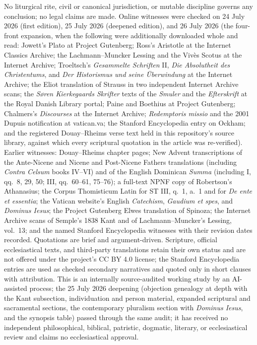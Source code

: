 No liturgical rite, civil or canonical jurisdiction, or mutable discipline governs any conclusion; no legal claims are made. Online witnesses were checked on 24 July 2026 (first edition), 25 July 2026 (deepened edition), and 26 July 2026 (the four-front expansion, when the following were additionally downloaded whole and read: Jowett's Plato at Project Gutenberg; Ross's Aristotle at the Internet Classics Archive; the Lachmann--Muncker Lessing and the Viv\`es Scotus at the Internet Archive; Troeltsch's \emph{Gesammelte Schriften} II, \emph{Die Absolutheit des Christentums}, and \emph{Der Historismus und seine \"Uberwindung} at the Internet Archive; the Eliot translation of Strauss in two independent Internet Archive scans; the \emph{S\o ren Kierkegaards Skrifter} texts of the \emph{Smuler} and the \emph{Efterskrift} at the Royal Danish Library portal; Paine and Boethius at Project Gutenberg; Chalmers's \emph{Discourses} at the Internet Archive; \emph{Redemptoris missio} and the 2001 Dupuis notification at vatican.va; the Stanford Encyclopedia entry on Ockham; and the registered Douay--Rheims verse text held in this repository's source library, against which every scriptural quotation in the article was re-verified). Earlier witnesses: Douay--Rheims chapter pages; New Advent transcriptions of the Ante-Nicene and Nicene and Post-Nicene Fathers translations (including \emph{Contra Celsum} books IV--VI) and of the English Dominican \emph{Summa} (including I, qq.~8, 29, 50; III, qq.~60--61, 75--76); a full-text NPNF copy of Robertson's Athanasius; the Corpus Thomisticum Latin for ST III, q.~1, a.~1 and for \emph{De ente et essentia}; the Vatican website's English \emph{Catechism}, \emph{Gaudium et spes}, and \emph{Dominus Iesus}; the Project Gutenberg Elwes translation of Spinoza; the Internet Archive scans of Semple's 1838 Kant and of Lachmann--Muncker's Lessing, vol.~13; and the named Stanford Encyclopedia witnesses with their revision dates recorded. Quotations are brief and argument-driven. Scripture, official ecclesiastical texts, and third-party translations retain their own status and are not offered under the project's CC BY 4.0 license; the Stanford Encyclopedia entries are used as checked secondary narratives and quoted only in short clauses with attribution. This is an internally source-audited working study by an AI-assisted process; the 25 July 2026 deepening (objection genealogy at depth with the Kant subsection, individuation and person material, expanded scriptural and sacramental sections, the contemporary pluralism section with \emph{Dominus Iesus}, and the synopsis table) passed through the same audit; it has received no independent philosophical, biblical, patristic, dogmatic, literary, or ecclesiastical review and claims no ecclesiastical approval.
